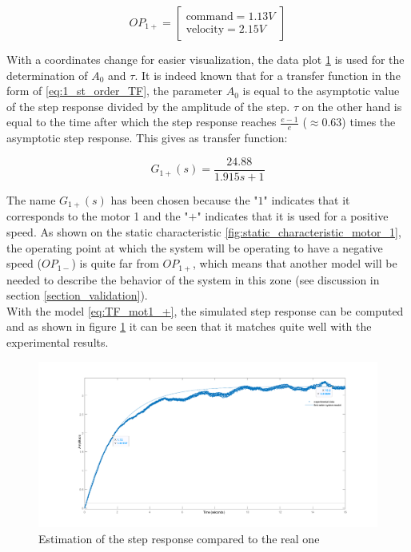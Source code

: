 \begin{equation}
    OP_{1+} = \begin{bmatrix}
        \text{command} = 1.13 V \\
        \text{velocity} = 2.15 V
    \end{bmatrix}
\end{equation}

With a coordinates change for easier visualization, the data plot \ref{fig:estimated_step_response_positive_motor_1} is 
used for the determination of $A_0$ and $\tau$. It is indeed known that for a transfer function in the form of 
\ref{eq:1_st_order_TF}, the parameter $A_0$ is equal to the asymptotic value of the step response divided by the amplitude 
of the step. $\tau$ on the other hand is equal to the time after which the step response reaches $\frac{e-1}{e}$ ($\approx 0.63$)
times the asymptotic step response. This gives as transfer function:

\begin{equation}
    G_{1+}(s) = \frac{24.88}{1.915s + 1}
    \label{eq:TF_mot1_+}
\end{equation}

The name $G_{1+}(s)$ has been chosen because the "\textit{$1$}" indicates that it corresponds to the motor 1 and the 
"\textit{$+$}" indicates that it is used for a positive speed. As shown on the static characteristic 
\ref{fig:static_characteristic_motor_1}, the operating point at which the system will be operating to have a negative speed 
($OP_{1-}$) is quite far from $OP_{1+}$, which means that another model will be needed to describe the behavior of the 
system in this zone (see discussion in section \ref{section_validation}).\\

With the model \ref{eq:TF_mot1_+}, the simulated step response can be computed and as shown in figure 
\ref{fig:estimated_step_response_positive_motor_1} it can be seen that it matches quite well with the experimental results.

\begin{figure}[H]
    \centering
    \includegraphics[height=\textheight/3]{Pictures/first_order_model_positive_motor_1.png}
    \caption{Estimation of the step response compared to the real one}
    \label{fig:estimated_step_response_positive_motor_1}
\end{figure}


